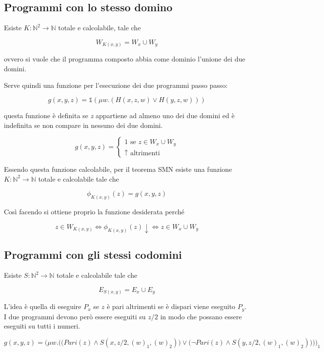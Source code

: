 \subsection{Programmi con lo stesso domino}

Esiste $ K : \mathbb{N}^2 \rightarrow \mathbb{N} $ totale e calcolabile, tale che

$$
W_{K(x,y)} = W_x \cup W_y
$$

ovvero si vuole che il programma composto abbia come dominio l'unione dei due domini.

Serve quindi una funzione per l'esecuzione dei due programmi passo passo:

$$
g(x,y,z) = \mathbb{1}(\mu w. ( H(x,z,w) \vee H(y,z,w)))
$$

questa funzione è definita se \textit{z} appartiene ad almeno uno dei due domini ed è indefinita se non compare in nessuno dei due domini.

$$
g(x,y,z) = \begin{cases}
1 \text{ se } z \in W_x \cup W_y \\
\uparrow \text{ altrimenti}
\end{cases}
$$

Essendo questa funzione calcolabile, per il teorema SMN esiste una funzione $ K : \mathbb{N}^2 \rightarrow \mathbb{N} $ totale e calcolabile tale che

$$
\phi_{K(x,y)}(z) = g(x,y,z)
$$

Così facendo si ottiene proprio la funzione desiderata perché

$$
z \in W_{K(x,y)} \Leftrightarrow \phi_{K(x,y)}(z)\downarrow \Leftrightarrow z \in W_x \cup W_y
$$

\subsection{Programmi con gli stessi codomini}

Esiste $ S : \mathbb{N}^2 \rightarrow \mathbb{N} $ totale e calcolabile tale che 

$$
E_{S(x,y)} = E_x \cup E_y
$$

L'idea è quella di eseguire $ P_x $ se $ z $ è pari altrimenti se è dispari viene eseguito $ P_y $. I due programmi devono però essere eseguiti su $ z/2 $ in modo che possano essere eseguiti su tutti i numeri.

$$
g(x,y,z) =\bigg( \mu w. \Big( \big(Pari(z) \wedge S(x,z/2, (w)_1, (w)_2)\big) \vee \big( \neg Pari(z) \wedge S(y,z/2, (w)_1, (w)_2) \big) \Big) \bigg)_1
$$

